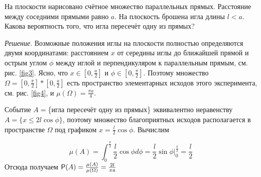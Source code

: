 \begin{example}
	\label{ex:4.21}
На плоскости нарисовано счётное множество параллельных прямых. Расстояние между соседними прямыми равно $a$. На плоскость брошена игла длины $l < a$. Какова вероятность
того, что игла пересечёт одну из прямых?

\textit{Решение}. Возможные положения иглы на плоскости полностью определяются двумя координатами: расстоянием $x$ от середины иглы до ближайшей прямой и острым углом $\phi$ между иглой и перпендикуляром к параллельным прямым, см. рис. \ref{fig3}. Ясно, что $x \in [0, \frac{a}{2} ]$ и $\phi \in [0, \frac{\pi}{2} ]$. Поэтому множество $\Omega = [0, \frac{\pi}{2}] * [0, \frac{a}{2} ]$ есть пространство элементарных исходов этого эксперимента, см. рис. \ref{fig4}, и $\mu(\Omega) = \frac{\pi a}{4}$.

Событие $A =$\{игла пересечёт одну из прямых\} эквивалентно неравенству
$A = \{x \leq 2{{l}} \cos \phi \}$, поэтому множество благоприятных исходов располагается в пространстве $\Omega$ под графиком $x = \frac{ {{l}}}{2} \cos \phi$. Вычислим

$$\mu(A)=\int_{0}^{\frac{\pi}{2}} \frac{{{l}}}{2} \cos \phi d\phi = \frac{{{l}}}{2} \sin \phi \bigg|_0^{\frac{\pi}{2}} = \frac{{{l}}}{2}$$
Отсюда получаем $\P(A) = \frac{\mu(A)}{\mu(\Omega)}
 = \frac{2{{l}}}{\pi a}$
\end{example}
